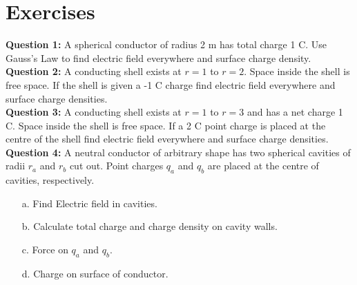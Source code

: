 \documentclass[12pt,a4paper]{article}
\begin{document}
\section{Exercises}
\noindent\textbf{Question 1:} A spherical conductor of radius 2 m has total charge 1 C. Use Gauss's Law to find electric field everywhere and surface charge density.\\[0.2cm]
\noindent\textbf{Question 2:} A conducting shell exists at $r=1$ to $r=2$. Space inside the shell is free space. If the shell is given a -1 C charge find electric field everywhere and surface charge densities.\\[0.2cm]
\noindent\textbf{Question 3:} A conducting shell exists at $r=1$ to $r=3$ and has a net charge 1 C. Space inside the shell is free space. If a 2 C point charge is placed at the centre of the shell find electric field everywhere and surface charge densities.\\[0.2cm]
\noindent\textbf{Question 4:} A neutral conductor of arbitrary shape has two spherical cavities of radii $r_a$ and $r_b$ cut out. Point charges $q_a$ and $q_b$ are placed at the centre of cavities, respectively.
\begin{itemize}
\item[a.] Find Electric field in cavities.
\item[b.] Calculate total charge and charge density on cavity walls.
\item[c.] Force on $q_a$ and $q_b$.
\item[d.] Charge on surface of conductor.
\end{itemize}
%
%
\end{document}
